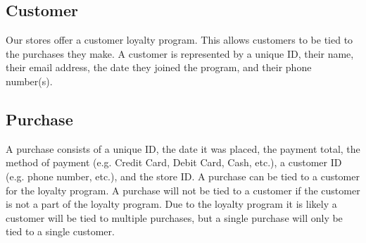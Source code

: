 \documentclass{article}
\begin{document}
		\subsection{Customer}
			Our stores offer a customer loyalty program. This allows customers to be
			tied to the purchases they make. A customer is represented by a unique ID,
			their name, their email address, the date they joined the program, and
			their phone number(s).

		\subsection{Purchase}
			A purchase consists of a unique ID, the date it was placed, the payment
			total, the method of payment (e.g. Credit Card, Debit Card, Cash, etc.), a
			customer ID (e.g. phone number, etc.), and the store ID. A purchase can
			be tied to a customer for the loyalty program. A purchase will not be
			tied to a customer if the customer is not a part of the loyalty program.
			Due to the loyalty program it is likely a customer will be tied to
			multiple purchases, but a single purchase will only be tied to a
			single customer.
			
\end{document}
